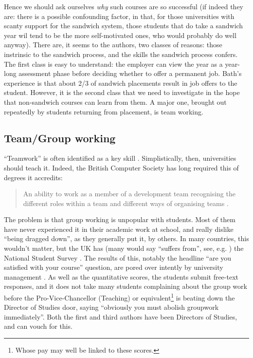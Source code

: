 \documentclass[sigconf]{acmart}
\begin{document}
Hence we should ask ourselves \emph{why} such courses are so
successful (if indeed they are: there is a possible confounding
factor, in that, for those universities with scanty support for the
sandwich system, those students that do take a sandwich year wil tend
to be the more self-motivated ones, who would probably do well
anyway).  %
There are, it seems to the
authors, two classes of reasons: those instrinsic to the sandwich
process, and the skills the sandwich process confers. The first class
is easy to understand: the employer can view the year as a year-long
assessment phase before deciding whether to offer a permanent
job. Bath's experience is that about 2/3 of sandwich placements result
in job offers to the student. However, it is the second class that we
need to investigate in the hope that non-sandwich courses can learn from them. A major one, brought out repeatedly by students
returning from placement, is team working.

\subsection{Team/Group working}

``Teamwork'' is often identified as a key skill \cite[and many
others]{ArcherDavidson2008}. Simplistically, then, universities should
teach it. Indeed, the British Computer Society has long required this
of degrees it accredits:
\begin{quote} An ability to work as a member of a development team
recognising the different roles within a team and different ways of
organising teams \cite[Requirement 2.3.1]{BCS2018a}.
\end{quote}
The problem is that group working is unpopular with students. Most of them have never experienced it in their academic work at school, and really dislike ``being dragged down'', as they generally put it, by others. In many countries, this wouldn't matter, but the UK has (many would say ``suffers from'', see, e.g. \cite{Cupples2015a}) the National Student Survey \cite{OfS2018a}. The results of this, notably the headline ``are you satisfied with your course'' question, are pored over intently by university management \cite[Myth 3]{OfS2018a}. As well as the quantitative scores, the students submit free-text responses, and it does not take many students complaining about the group work before the Pro-Vice-Chancellor (Teaching) or equivalent\footnote{Whose pay may well be linked to these scores.} is beating down the Director of Studies door, saying ``obviously you must abolish groupwork immediately''. Both the first and third authors have been Directors of Studies, and can vouch for this.
\end{document}
